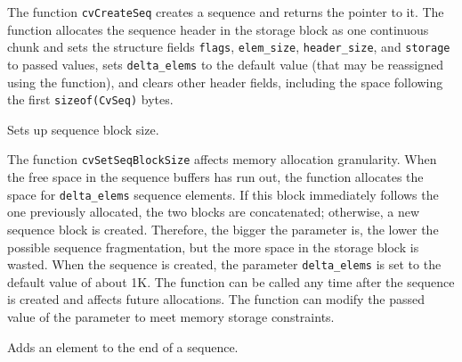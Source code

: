 The function \texttt{cvCreateSeq} creates a sequence and returns
the pointer to it. The function allocates the sequence header in
the storage block as one continuous chunk and sets the structure
fields \texttt{flags}, \texttt{elem\_size}, \texttt{header\_size}, and
\texttt{storage} to passed values, sets \texttt{delta\_elems} to the
default value (that may be reassigned using the 
function), and clears other header fields, including the space following
the first \texttt{sizeof(CvSeq)} bytes.

\label{SetSeqBlockSize}

Sets up sequence block size.


\begin{description}
\end{description}


The function \texttt{cvSetSeqBlockSize} affects memory allocation
granularity. When the free space in the sequence buffers has run out,
the function allocates the space for \texttt{delta\_elems} sequence
elements. If this block immediately follows the one previously allocated,
the two blocks are concatenated; otherwise, a new sequence block is
created. Therefore, the bigger the parameter is, the lower the possible
sequence fragmentation, but the more space in the storage block is wasted. When
the sequence is created, the parameter \texttt{delta\_elems} is set to
the default value of about 1K. The function can be called any time after
the sequence is created and affects future allocations. The function
can modify the passed value of the parameter to meet memory storage
constraints.

\label{SeqPush}

Adds an element to the end of a sequence.


\begin{description}
\end{description}


